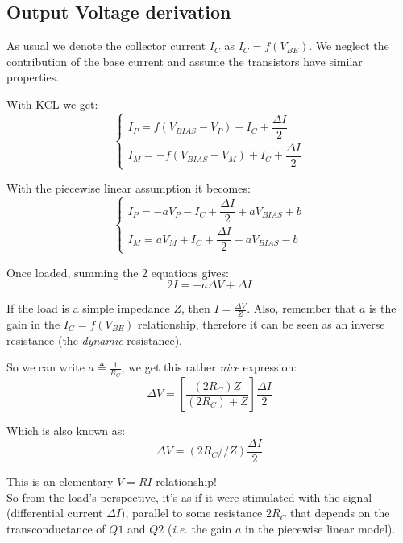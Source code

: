\documentclass[10pt]{article}
\begin{document}
\subsection*{Output Voltage derivation}
As usual we denote the collector current $I_C$ as $I_C = f(V_{BE})$. We neglect the contribution of the base current and assume the transistors have similar properties.

With KCL we get:
$$
\left\{
	\begin{array}{ll}
		I_P = f(V_{BIAS}-V_P) - I_C + \dfrac{\Delta I}{2}\\
		I_M = -f(V_{BIAS}-V_M) + I_C + \dfrac{\Delta I}{2}
	\end{array}
\right.
$$

With the piecewise linear assumption it becomes:
$$
\left\{
	\begin{array}{ll}
		I_P = -a V_P - I_C + \dfrac{\Delta I}{2} + a V_{BIAS} + b\\
		I_M = a V_M + I_C + \dfrac{\Delta I}{2} - a V_{BIAS} - b
	\end{array}
\right.
$$

Once loaded, summing the 2 equations gives:
$$
2I = -a \Delta V + \Delta I
$$

If the load is a simple impedance $Z$, then $I = \frac{\Delta V}{Z}$. Also, remember that $a$ is the gain in the $I_C = f(V_{BE})$ relationship, therefore it can be seen as an inverse resistance (the \textit{dynamic} resistance).

So we can write $a \triangleq \frac{1}{R_C}$, we get this rather \textit{nice} expression:
$$
\Delta V = \left[ \dfrac{(2R_C) Z}{(2R_C) + Z} \right] \dfrac{\Delta I}{2}
$$

Which is also known as:
$$
\Delta V = \left( 2R_C // Z \right) \dfrac{\Delta I}{2}
$$

This is an elementary $V=RI$ relationship!\\

So from the load's perspective, it's as if it were stimulated with the signal (differential current $\Delta I$), parallel to some resistance $2R_C$ that depends on the transconductance of $Q1$ and $Q2$ (\textit{i.e.} the gain $a$ in the piecewise linear model).
\end{document}
